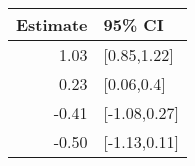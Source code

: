 \begin{tabular}{rl}
  \hline
Estimate & 95\% CI \\ 
  \hline
1.03 & [0.85,1.22] \\ 
  0.23 & [0.06,0.4] \\ 
  -0.41 & [-1.08,0.27] \\ 
  -0.50 & [-1.13,0.11] \\ 
   \hline
\end{tabular}

